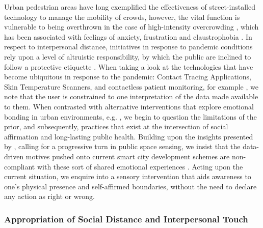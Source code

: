 Urban pedestrian areas have long exemplified the effectiveness of street-installed technology to manage the mobility of crowds, however, the vital function is vulnerable to being overthrown in the case of high-intensity overcrowding \citep{gehl_public_2004,machleit_perceived_2000}, which has been associated with feelings of anxiety, frustration and claustrophobia \citep{kendrick_user_2010}. In respect to interpersonal distance, initiatives in response to pandemic conditions rely upon a level of altruistic responsibility, by which the public are inclined to follow a protective etiquette \citep{honey-roses_impact_2020}. When taking a look at the technologies that have become ubiquitous in response to the pandemic: Contact Tracing Applications, Skin Temperature Scanners, and contactless patient monitoring, for example \citep{mehrdad_perspective_2021,taylor_review_2020}, we note that the user is constrained to one interpretation of the data made available to them. When contrasted with alternative interventions that explore emotional bonding in urban environments, e.g. \citep{adhitya_london_2018,gatehouse_feral_2016}, we begin to question the limitations of the prior, and subsequently, practices that exist at the intersection of social affirmation and long-lasting public health. Building upon the insights presented by \cite{howell_life-affirming_2019}, calling for a progressive turn in public space sensing, we insist that the data-driven motives pushed onto current smart city development schemes are non-compliant with these sort of shared emotional experiences \citep{battarbee_pools_2002,lange_owning_2013,bueno_smart_2016}. Acting upon the current situation, we enquire into a sensory intervention that aids awareness to one's physical presence and self-affirmed boundaries, without the need to declare any action as right or wrong.

\subsubsection{Appropriation of Social Distance and Interpersonal Touch}
\label{subsec:safety}

